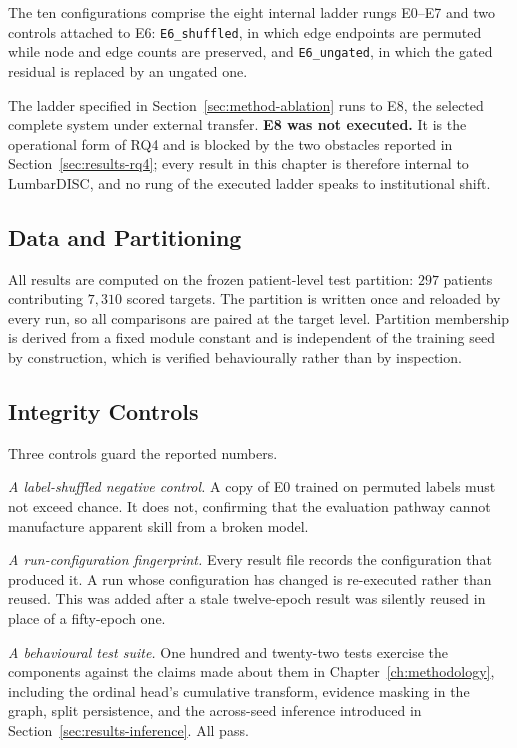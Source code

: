 \documentclass[12pt,a4paper]{report}
\begin{document}
The ten configurations comprise the eight internal ladder rungs E0--E7 and
two controls attached to E6: \texttt{E6\_shuffled}, in which edge endpoints are permuted while
node and edge counts are preserved, and \texttt{E6\_ungated}, in which the gated
residual is replaced by an ungated one.

The ladder specified in Section~\ref{sec:method-ablation} runs to E8, the
selected complete system under external transfer. \textbf{E8 was not executed.}
It is the operational form of RQ4 and is blocked by the two obstacles reported in
Section~\ref{sec:results-rq4}; every result in this chapter is therefore internal
to LumbarDISC, and no rung of the executed ladder speaks to institutional shift.

\subsection{Data and Partitioning}

All results are computed on the frozen patient-level test partition: $297$
patients contributing $7{,}310$ scored targets. The partition is written once
and reloaded by every run, so all comparisons are paired at the target level.
Partition membership is derived from a fixed module constant and is independent
of the training seed by construction, which is verified behaviourally rather
than by inspection.

\subsection{Integrity Controls}

Three controls guard the reported numbers.

\emph{A label-shuffled negative control.} A copy of E0 trained on permuted labels
must not exceed chance. It does not, confirming that the evaluation pathway
cannot manufacture apparent skill from a broken model.

\emph{A run-configuration fingerprint.} Every result file records the
configuration that produced it. A run whose configuration has changed is
re-executed rather than reused. This was added after a stale twelve-epoch result
was silently reused in place of a fifty-epoch one.

\emph{A behavioural test suite.} One hundred and twenty-two tests exercise the
components against the claims made about them in Chapter~\ref{ch:methodology},
including the ordinal head's cumulative transform, evidence masking in the graph,
split persistence, and the across-seed inference introduced in
Section~\ref{sec:results-inference}. All pass.
\end{document}
